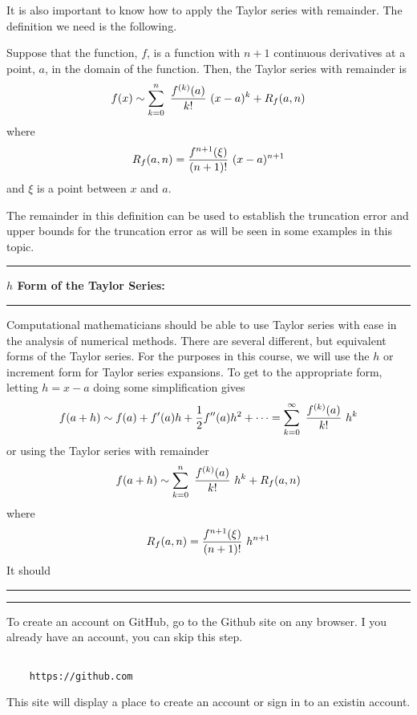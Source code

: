\documentclass[10pt,fleqn]{article}
\begin{document}
It is also important to know how to apply the Taylor series with remainder. The
definition we need is the following.
\begin{definition}
  Suppose that the function, \(f\), is a function with \(n+1\) continuous
  derivatives at a point, \(a\), in the domain of the function. Then, the Taylor
  series with remainder is
  \[
    f(x) \sim \sum_{k=0}^n\ {{f^{(k)}(a)}\over{k!}}\ ( x - a )^k
                   + R_f(a,n)
  \]
  where
  \[
    R_f(a,n) = {{f^{n+1}(\xi)}\over{(n+1)!}}\ ( x - a )^{n+1}
  \]
  and \(\xi\) is a point between \(x\) and \(a\).
\end{definition}
The remainder in this definition can be used to establish the truncation error
and upper bounds for the truncation error as will be seen in some examples in
this topic.
\vskip0.1in\hrule\vskip0.1in\noindent
{\bf \(h\) Form of the Taylor Series:} 
\vskip0.1in\hrule\vskip0.1in\noindent
Computational mathematicians should be able to use Taylor series with ease in
the analysis of numerical methods. There are several different, but equivalent
forms of the Taylor series. For the purposes in this course, we will use the
\(h\) or increment form for Taylor series expansions. To get to the appropriate
form, letting \(h=x-a\) doing some simplification gives
\[
  f(a+h) \sim f(a) + f'(a) h + {1\over 2} f''(a) h^2 + \cdots
          = \sum_{k=0}^\infty\ {{f^{(k)}(a)}\over{k!}}\ h^k
\]
or using the Taylor series with remainder
\[
    f(a+h) \sim \sum_{k=0}^n\ {{f^{(k)}(a)}\over{k!}}\ h^k
                   + R_f(a,n)
\]
where
\[
  R_f(a,n) = {{f^{n+1}(\xi)}\over{(n+1)!}}\ h^{n+1}
\]
It should
\vskip0.1in\hrule\vskip0.1in\noindent
{\bf } 
\vskip0.1in\hrule\vskip0.1in\noindent
To create an account on GitHub, go to the Github site on any browser. I you
already have an account, you can skip this step.
\begin{verbatim}

    https://github.com

\end{verbatim}
This site will display a place to create an account or sign in to an existin
account.
\end{document}
